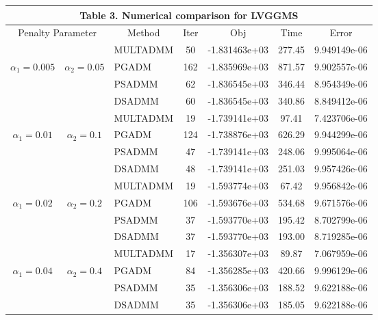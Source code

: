 \documentclass{mcom-l}
\theoremstyle{definition}
\theoremstyle{remark}
\numberwithin{equation}{section}
\begin{document}
\begin{center}
{\scriptsize\vskip 0.1cm
\begin{tabular}{|c c|| l || c| c| c| c|}
\multicolumn{7}{c}{\small{Table 3. Numerical comparison for LVGGMS}}\\
\hline
   \multicolumn{2}{|c||}{Penalty Parameter}&\multicolumn{1}{c||}{\hbox{Method}}&\hbox{Iter}&\hbox{Obj}&\hbox{Time}&\hbox{Error}\\
\hline
                    &                   &MULTADMM   &50     &-1.831463e+03  &277.45     &9.949149e-06\\
\cline{3-7}
$\alpha_1 = 0.005$  &$\alpha_2 = 0.05$  &PGADM       &162    &-1.835969e+03  &871.57     &9.902557e-06\\
\cline{3-7}
                    &                   &PSADMM &62     &-1.836545e+03  &346.44     &8.954349e-06\\
\cline{3-7}
                    &                   &DSADMM &60     &-1.836545e+03  &340.86     &8.849412e-06\\
\hline
                    &                   &MULTADMM   &19     &-1.739141e+03  &97.41      &7.423706e-06\\
\cline{3-7}
$\alpha_1 = 0.01$       &$\alpha_2= 0.1$        &PGADM       &124    &-1.738876e+03  &626.29     &9.944299e-06\\
\cline{3-7}
                    &                   &PSADMM &47     &-1.739141e+03  &248.06     &9.995064e-06\\
\cline{3-7}
                    &                   &DSADMM &48     &-1.739141e+03  &251.03     &9.957426e-06\\
\hline
                    &                   &MULTADMM   &19     &-1.593774e+03  &67.42      &9.956842e-06\\
\cline{3-7}
$\alpha_1 = 0.02$       &$\alpha_2 = 0.2$       &PGADM       &106    &-1.593676e+03  &534.68     &9.671576e-06\\
\cline{3-7}
                    &                   &PSADMM &37     &-1.593770e+03  &195.42     &8.702799e-06\\
\cline{3-7}
                    &                   &DSADMM &37     &-1.593770e+03  &193.00     &8.719285e-06\\
\hline
                    &                   &MULTADMM   &17     &-1.356307e+03  &89.87      &7.067959e-06\\
\cline{3-7}
$\alpha_1 = 0.04$       &$\alpha_2 = 0.4$       &PGADM       &84     &-1.356285e+03  &420.66     &9.996129e-06\\
\cline{3-7}
                    &                   &PSADMM &35     &-1.356306e+03  &188.52     &9.622188e-06\\
\cline{3-7}
                    &                   &DSADMM &35     &-1.356306e+03  &185.05     &9.622188e-06\\
\hline
\end{tabular}
}
\end{center}
\end{document}
